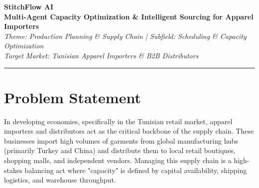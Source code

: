 \documentclass[11pt,a4paper]{article}
\begin{document}
\begin{center}
    {\color{primary}\Huge \textbf{StitchFlow AI}}\\[0.4em]
    {\color{secondary}\large \textbf{Multi-Agent Capacity Optimization \& Intelligent Sourcing for Apparel Importers}}\\[0.8em]
    \textit{Theme: Production Planning \& Supply Chain | Subfield: Scheduling \& Capacity Optimization}\\
    \textit{Target Market: Tunisian Apparel Importers \& B2B Distributors}
    \vspace{1.5em}
\end{center}

\hrule
\vspace{1em}

\section{Problem Statement}
In developing economies, specifically in the Tunisian retail market, apparel importers and distributors act as the critical backbone of the supply chain. These businesses import high volumes of garments from global manufacturing hubs (primarily Turkey and China) and distribute them to local retail boutiques, shopping malls, and independent vendors. Managing this supply chain is a high-stakes balancing act where "capacity" is defined by capital availability, shipping logistics, and warehouse throughput.
\end{document}
